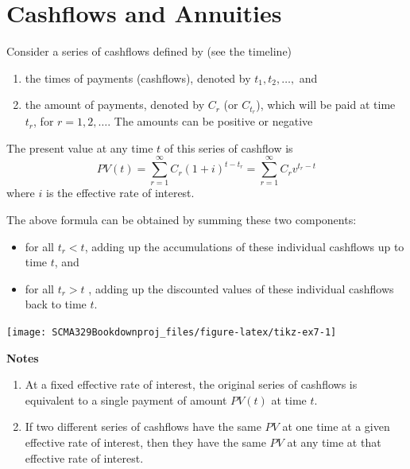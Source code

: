 \documentclass[
]{book}
\theoremstyle{definition}
\theoremstyle{definition}
\theoremstyle{definition}
\theoremstyle{definition}
\theoremstyle{remark}
\begin{document}
\hypertarget{cashflows-and-annuities}{%
\section{Cashflows and Annuities}\label{cashflows-and-annuities}}

Consider a series of cashflows defined by (see the timeline)

\begin{enumerate}
\def\labelenumi{\arabic{enumi}.}
\item
  the times of payments (cashflows), denoted by \(t_1, t_2, \ldots,\)
  and
\item
  the amount of payments, denoted by \(C_{r}\) (or \(C_{t_r}\)), which
  will be paid at time \(t_r\), for \(r = 1,2, \ldots\). The amounts can
  be positive or negative
\end{enumerate}

The present value at any time \(t\) of this series of cashflow is
\[PV(t) = \sum_{r=1}^\infty C_r (1 + i)^{t - t_r} = \sum_{r=1}^\infty C_r v^{t _r - t}\]
where \(i\) is the effective rate of interest.

The above formula can be obtained by summing these two components:

\begin{itemize}
\item
  for all \(t_r < t\), adding up the accumulations of these individual
  cashflows up to time \(t\), and
\item
  for all \(t_r > t\) , adding up the discounted values of these
  individual cashflows back to time \(t\).
\end{itemize}

\begin{center}\texttt{[image: SCMA329Bookdownproj\_files/figure-latex/tikz-ex7-1]} \end{center}

\textbf{Notes}

\begin{enumerate}
\def\labelenumi{\arabic{enumi}.}
\item
  At a fixed effective rate of interest, the original series of
  cashflows is equivalent to a single payment of amount \(PV(t)\) at
  time \(t\).
\item
  If two different series of cashflows have the same \(PV\) at one time
  at a given effective rate of interest, then they have the same \(PV\)
  at any time at that effective rate of interest.
\end{enumerate}
\end{document}
